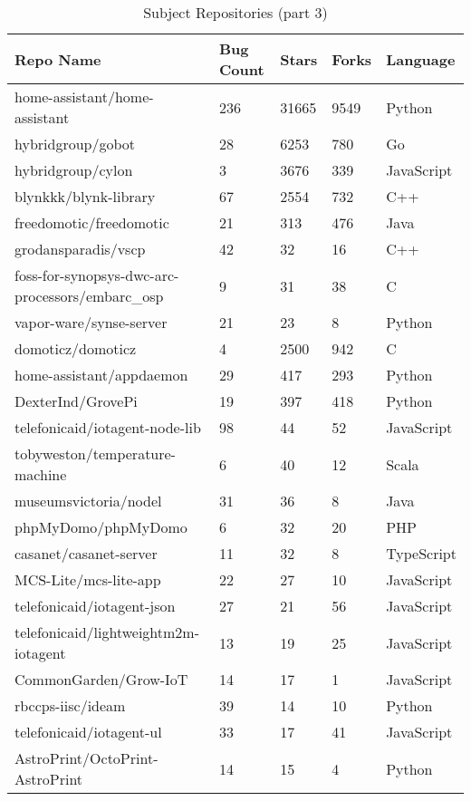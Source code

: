 \begin{table}
    \centering
    \caption{Subject Repositories (part 3)}
    \begin{tabular}{|l|l|l|l|l|}
    \hline
         \textbf{Repo Name} & \textbf{Bug Count} & \textbf{Stars} & \textbf{Forks} & \textbf{Language} \\ \hline
        home-assistant/home-assistant & 236 & 31665 & 9549 & Python \\ \hline
        hybridgroup/gobot & 28 & 6253 & 780 & Go \\ \hline
        hybridgroup/cylon & 3 & 3676 & 339 & JavaScript \\ \hline
        blynkkk/blynk-library & 67 & 2554 & 732 & C++ \\ \hline
        freedomotic/freedomotic & 21 & 313 & 476 & Java \\ \hline
        grodansparadis/vscp & 42 & 32 & 16 & C++ \\ \hline
        foss-for-synopsys-dwc-arc-processors/embarc\_osp & 9 & 31 & 38 & C \\ \hline
        vapor-ware/synse-server & 21 & 23 & 8 & Python \\ \hline
        domoticz/domoticz & 4 & 2500 & 942 & C \\ \hline
        home-assistant/appdaemon & 29 & 417 & 293 & Python \\ \hline
        DexterInd/GrovePi & 19 & 397 & 418 & Python \\ \hline
        telefonicaid/iotagent-node-lib & 98 & 44 & 52 & JavaScript \\ \hline
        tobyweston/temperature-machine & 6 & 40 & 12 & Scala \\ \hline
        museumsvictoria/nodel & 31 & 36 & 8 & Java \\ \hline
        phpMyDomo/phpMyDomo & 6 & 32 & 20 & PHP \\ \hline
        casanet/casanet-server & 11 & 32 & 8 & TypeScript \\ \hline
        MCS-Lite/mcs-lite-app & 22 & 27 & 10 & JavaScript \\ \hline
        telefonicaid/iotagent-json & 27 & 21 & 56 & JavaScript \\ \hline
        telefonicaid/lightweightm2m-iotagent & 13 & 19 & 25 & JavaScript \\ \hline
        CommonGarden/Grow-IoT & 14 & 17 & 1 & JavaScript \\ \hline
        rbccps-iisc/ideam & 39 & 14 & 10 & Python \\ \hline
        telefonicaid/iotagent-ul & 33 & 17 & 41 & JavaScript \\ \hline
        AstroPrint/OctoPrint-AstroPrint & 14 & 15 & 4 & Python \\ \hline
    \end{tabular}
\end{table}

